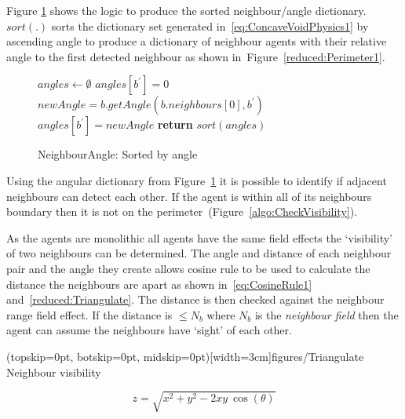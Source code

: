 \documentclass{ieeeaccess}
\begin{document}
Figure \ref{algo:getNeighbourAngles} shows the logic to produce the sorted neighbour/angle dictionary. $sort(.)$ sorts the dictionary set generated in~\eqref{eq:ConcaveVoidPhysics1} by ascending angle to produce a dictionary of neighbour agents with their relative angle to the first detected neighbour as shown in~Figure~\ref{reduced:Perimeter1}.

\begin{figure}
\begin{algorithmic}
\tiny
{}
\State $angles \leftarrow \emptyset$
      \State $angles[b^{'}] = 0$
	\Else
		\State $newAngle = b.getAngle(b.neighbours[0], b^{'})$
	   \State $angles[b^{'}] = newAngle$
	\EndIf
\EndFor
\State\textbf{return} $sort(angles)$ 
\EndProcedure
\end{algorithmic}
\caption{NeighbourAngle: Sorted by angle}
\label{algo:getNeighbourAngles}
\end{figure}

Using the angular dictionary from Figure~\ref{algo:getNeighbourAngles} it is possible to identify if adjacent neighbours can detect each other. If the agent is within all of its neighbours boundary then it is not on the perimeter~(Figure~\ref{algo:CheckVisibility}). 

As the agents are monolithic all agents have the same field effects the `visibility' of two neighbours can be determined. The angle and distance of each neighbour pair and the angle they create allows cosine rule to be used to calculate the distance the neighbours are apart as shown in~\eqref{eq:CosineRule1} and~\ref{reduced:Triangulate}. The distance is then checked against the neighbour range field effect. If the distance is $\leq N_b$ where $N_b$ is the \textit{neighbour field} then the agent can assume the neighbours have `sight' of each other. 

\Figure[t!](topskip=0pt, botskip=0pt, midskip=0pt)[width=3cm]{figures/Triangulate}
{Neighbour visibility\label{reduced:Triangulate}}


\begin{equation}
\label{eq:CosineRule1}
z = \sqrt{x^2 + y^2 - 2xy~\cos(\theta)}
\end{equation}
\end{document}

